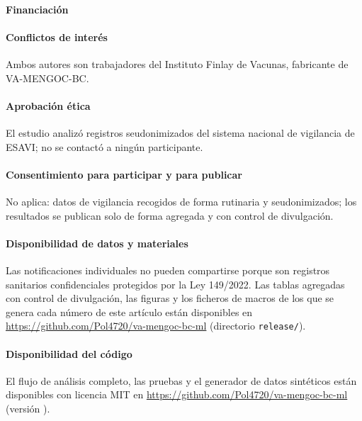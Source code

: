 \small
\paragraph{Financiación} 

\paragraph{Conflictos de interés} Ambos autores son trabajadores del Instituto Finlay de Vacunas,
fabricante de VA-MENGOC-BC. 

\paragraph{Aprobación ética} El estudio analizó registros seudonimizados del sistema nacional de
vigilancia de ESAVI; no se contactó a ningún participante. 

\paragraph{Consentimiento para participar y para publicar} No aplica: datos de vigilancia
recogidos de forma rutinaria y seudonimizados; los resultados se publican solo de forma agregada y
con control de divulgación.

\paragraph{Disponibilidad de datos y materiales} Las notificaciones individuales no pueden
compartirse porque son registros sanitarios confidenciales protegidos por la Ley 149/2022. Las
tablas agregadas con control de divulgación, las figuras y los ficheros de macros de los que se
genera cada número de este artículo están disponibles en
\url{https://github.com/Pol4720/va-mengoc-bc-ml} (directorio \texttt{release/}).

\paragraph{Disponibilidad del código} El flujo de análisis completo, las pruebas y el generador de
datos sintéticos están disponibles con licencia MIT en
\url{https://github.com/Pol4720/va-mengoc-bc-ml} (versión \VCodeVersion).

